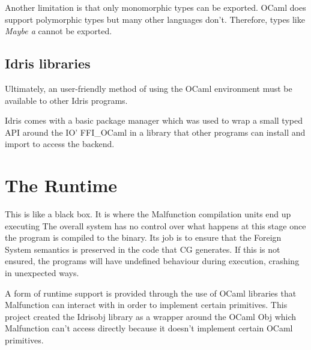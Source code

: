 Another limitation is that only monomorphic types can be exported. OCaml
does support polymorphic types but many other languages don't.
Therefore, types like \emph{Maybe a} cannot be exported.

\subsection{Idris libraries}
Ultimately, an user-friendly method of using the OCaml environment must be
available to other Idris programs.

Idris comes with a basic package manager which was used to wrap a small typed
API around the IO' FFI\_OCaml in a library that other programs can install
and import to access the backend.

\section{The Runtime}
This is like a black box. It is where the Malfunction compilation
units end up executing
The overall system has no control over what happens at this stage
once the program is compiled to the binary. Its job is to ensure that
the Foreign System semantics is preserved in the code that CG
generates. If this is not ensured, the programs will have
undefined behaviour during execution, crashing in unexpected ways.

A form of runtime support is provided through the use of
OCaml libraries that Malfunction can interact with in order to
implement certain primitives. This project created the Idrisobj
library as a wrapper around the OCaml Obj which Malfunction can't
access directly because it doesn't implement certain OCaml
primitives.